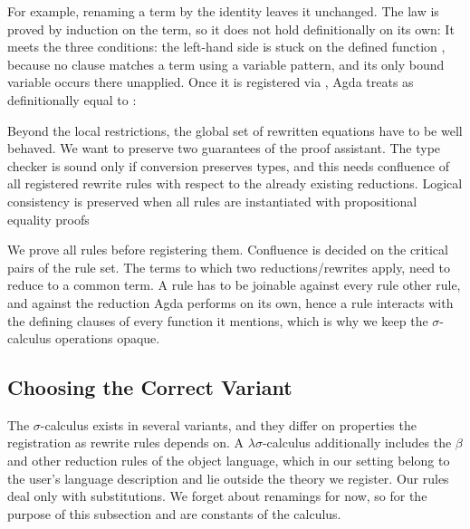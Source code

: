 \documentclass[sigplan,anonymous,review]{acmart}
\newcommand{\ag}[1]{\AgdaFunction{#1}}
\theoremstyle{acmdefinition}
\begin{document}
For example, renaming a term by the identity leaves it unchanged. The law is
proved by induction on the term, so it does not hold definitionally on its own:
\ERewrite{} It meets the three conditions: the left-hand side is stuck on the
defined function , because no clause matches a term using
a variable pattern, and its only bound variable  occurs there
unapplied. Once it is registered via \ERewriteIt{}, Agda treats 
\AgdaFunction{[}  \AgdaFunction{]ᴿ} as definitionally equal
to : \ERewriteEx{}

Beyond the local restrictions, the global set of rewritten equations have to be
well behaved. We want to preserve two guarantees of the proof assistant. The
type checker is sound only if conversion preserves types, and this needs
confluence of all registered rewrite rules with respect to the already existing
reductions. Logical consistency is preserved when all rules are instantiated
with propositional equality proofs~\cite[Sect.~3 and 6.4]{10.1145/3434341}

We prove all rules before registering them. Confluence is decided on the
critical pairs of the rule set. The terms to which two reductions/rewrites
apply, need to reduce to a common term. A rule has to be joinable against every
rule other rule, and against the reduction Agda performs on its own, hence a
rule interacts with the defining clauses of every function it mentions, which
is why we keep the $σ$-calculus operations opaque.

\subsection{Choosing the Correct Variant}\label{sec:pre-sig}

The $σ$-calculus exists in several variants, and they differ on properties the
registration as rewrite rules depends on. A $λσ$-calculus additionally includes
the $β$ and other reduction rules of the object language, which in our setting
belong to the user's language description and lie outside the theory we
register. Our rules deal only with substitutions. We forget about renamings for
now, so for the purpose of this subsection \ag{idˢ} and \ag{wkˢ} are constants
of the calculus.
\end{document}
